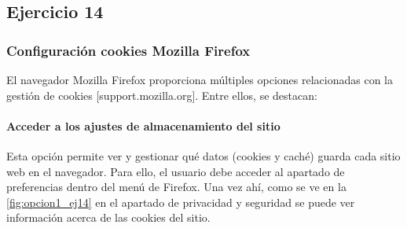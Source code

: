 \subsection{Ejercicio 14}
\graphicspath{ {img/14} }



\subsubsection{Configuración cookies Mozilla Firefox}

El navegador Mozilla Firefox proporciona múltiples opciones relacionadas con la gestión de cookies [support.mozilla.org]. Entre ellos, se destacan: 

\paragraph{Acceder a los ajustes de almacenamiento del sitio }

Esta opción permite ver y gestionar qué datos (cookies y caché) guarda cada sitio web en el navegador. Para ello, el usuario debe acceder al apartado de preferencias dentro del menú de Firefox. Una vez ahí, como se ve en la \ref{fig:opcion1_ej14} en el apartado de privacidad y seguridad se puede ver información acerca de las cookies del sitio. 

